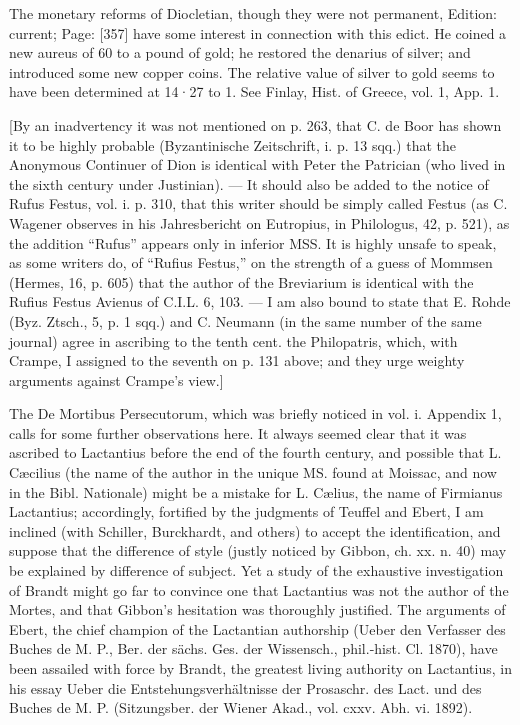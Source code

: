 The monetary reforms of Diocletian, though they were not permanent, Edition: current; Page: [357] have some interest in connection with this edict. He coined a new aureus of 60 to a pound of gold; he restored the denarius of silver; and introduced some new copper coins. The relative value of silver to gold seems to have been determined at 14·27 to 1. See Finlay, Hist. of Greece, vol. 1, App. 1.


[By an inadvertency it was not mentioned on p. 263, that C. de Boor has shown it to be highly probable (Byzantinische Zeitschrift, i. p. 13 sqq.) that the Anonymous Continuer of Dion is identical with Peter the Patrician (who lived in the sixth century under Justinian). \texthebrew{—} It should also be added to the notice of Rufus Festus, vol. i. p. 310, that this writer should be simply called Festus (as C. Wagener observes in his Jahresbericht on Eutropius, in Philologus, 42, p. 521), as the addition \texthebrew{“}Rufus\texthebrew{}” appears only in inferior MSS. It is highly unsafe to speak, as some writers do, of \texthebrew{“}Rufius Festus,\texthebrew{}” on the strength of a guess of Mommsen (Hermes, 16, p. 605) that the author of the Breviarium is identical with the Rufius Festus Avienus of C.I.L. 6, 103. \texthebrew{—} I am also bound to state that E. Rohde (Byz. Ztsch., 5, p. 1 sqq.) and C. Neumann (in the same number of the same journal) agree in ascribing to the tenth cent. the Philopatris, which, with Crampe, I assigned to the seventh on p. 131 above; and they urge weighty arguments against Crampe\texthebrew{}’s view.]

The De Mortibus Persecutorum, which was briefly noticed in vol. i. Appendix 1, calls for some further observations here. It always seemed clear that it was ascribed to Lactantius before the end of the fourth century, and possible that L. Cæcilius (the name of the author in the unique MS. found at Moissac, and now in the Bibl. Nationale) might be a mistake for L. Cælius, the name of Firmianus Lactantius; accordingly, fortified by the judgments of Teuffel and Ebert, I am inclined (with Schiller, Burckhardt, and others) to accept the identification, and suppose that the difference of style (justly noticed by Gibbon, ch. xx. n. 40) may be explained by difference of subject. Yet a study of the exhaustive investigation of Brandt might go far to convince one that Lactantius was not the author of the Mortes, and that Gibbon\texthebrew{}’s hesitation was thoroughly justified. The arguments of Ebert, the chief champion of the Lactantian authorship (Ueber den Verfasser des Buches de M. P., Ber. der sächs. Ges. der Wissensch., phil.-hist. Cl. 1870), have been assailed with force by Brandt, the greatest living authority on Lactantius, in his essay Ueber die Entstehungsverhältnisse der Prosaschr. des Lact. und des Buches de M. P. (Sitzungsber. der Wiener Akad., vol. cxxv. Abh. vi. 1892).

